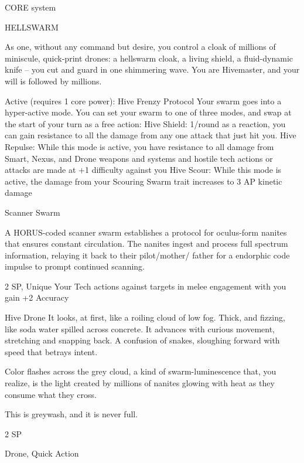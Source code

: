                                                CORE system 

                                                                                                          


                                                    HELLSWARM 

 As one, without any command but desire, you control a cloak of millions of miniscule, quick-print 
 drones: a hellswarm cloak, a living shield, a fluid-dynamic knife -- you cut and guard in one shimmering 
 wave. You are Hivemaster, and your will is followed by millions. 

 Active (requires 1 core power): Hive Frenzy 
 Protocol 
 Your swarm goes into a hyper-active mode. You can set your swarm to one of three modes, and swap 
 at the start of your turn as a free action: 
 Hive Shield: 1/round as a reaction, you can gain resistance to all the damage from any one attack that 
 just hit you. 
 Hive Repulse: While this mode is active, you have resistance to all damage from Smart, Nexus, and 
  Drone weapons and systems and hostile tech actions or attacks are made at +1 difficulty against you 
 Hive Scour: While this mode is active, the damage from your Scouring Swarm trait increases to 3 AP 
  kinetic damage 

Scanner Swarm  

A HORUS-coded scanner swarm establishes a protocol for oculus-form nanites that ensures constant  
circulation. The nanites ingest and process full spectrum information, relaying it back to their pilot/mother/ 
father for a endorphic code impulse to prompt continued scanning.   

2 SP, Unique  
Your Tech actions against targets in melee engagement with you gain +2 Accuracy
 

Hive Drone  
It looks, at first, like a roiling cloud of low fog. Thick, and fizzing, like soda water spilled across concrete. It  
advances with curious movement, stretching and snapping back. A confusion of snakes, sloughing forward  
with speed that betrays intent.  

Color flashes across the grey cloud, a kind of swarm-luminescence that, you realize, is the light created by  
millions of nanites glowing with heat as they consume what they cross.   

This is greywash, and it is never full.    

2 SP
 
Drone, Quick Action
 


